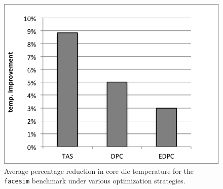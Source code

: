 \documentclass[times, 10pt,twocolumn]{IEEEtran}
\begin{document}
\begin{figure}[bpt]
  \centering
\includegraphics[scale=0.6]{graphics/tasvsedpc}
  \caption{Average percentage reduction in core die temperature for the
    \texttt{facesim} benchmark under various optimization strategies.}
  \label{fig:tasvsedp}
\end{figure}

\end{document}
